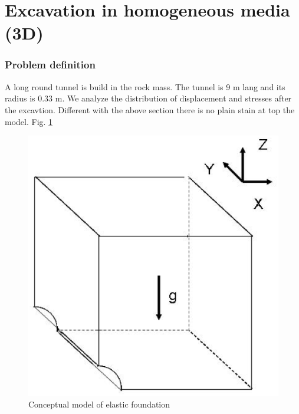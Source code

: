\section{Excavation in homogeneous media (3D)}
\subsubsection*{Problem definition}
A long round tunnel is build in the rock mass. The tunnel is 9 m lang and its radius is 0.33 m. We analyze the distribution of displacement and stresses after the excavtion. Different with the above section there is no plain stain at top the model. Fig. \ref{fme:e3d_g}

\begin{figure}[!htb]
  \begin{center}
    \includegraphics[scale=0.40]{M/e3d_g_model.eps}
  \end{center}
  \caption{Conceptual model of elastic foundation}
  \label{fme:e3d_g}
\end{figure}


